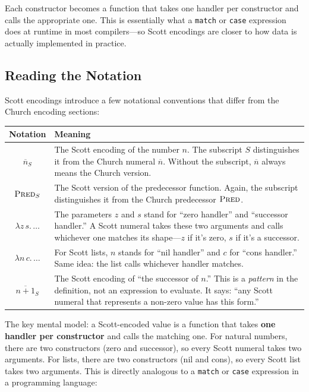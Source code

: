 \documentclass[11pt,a4paper]{article}
\theoremstyle{definition}
\newcommand{\lam}{\lambda}
\newcommand{\church}[1]{\overline{#1}}
\begin{document}
Each constructor becomes a
function that takes one handler per constructor and calls the appropriate one.
This is essentially what a \texttt{match} or \texttt{case} expression does
at runtime in most compilers---so Scott encodings are closer to how data is
actually implemented in practice.

\subsection{Reading the Notation}

Scott encodings introduce a few notational conventions that differ from the
Church encoding sections:

\begin{center}
\renewcommand{\arraystretch}{1.6}
\begin{tabular}{cp{10cm}}
\textbf{Notation} & \textbf{Meaning} \\
\hline
$\church{n}_S$ &
  The Scott encoding of the number $n$. The subscript $S$ distinguishes it from
  the Church numeral $\church{n}$. Without the subscript, $\church{n}$ always
  means the Church version. \\

$\textsc{Pred}_S$ &
  The Scott version of the predecessor function. Again, the subscript
  distinguishes it from the Church predecessor $\textsc{Pred}$. \\

$\lam z\, s.\, \ldots$ &
  The parameters $z$ and $s$ stand for ``zero handler'' and ``successor
  handler.'' A Scott numeral takes these two arguments and calls whichever one
  matches its shape---$z$ if it's zero, $s$ if it's a successor. \\

$\lam n\, c.\, \ldots$ &
  For Scott lists, $n$ stands for ``nil handler'' and $c$ for ``cons handler.''
  Same idea: the list calls whichever handler matches. \\

$\church{n+1}_S$ &
  The Scott encoding of ``the successor of $n$.'' This is a \emph{pattern} in
  the definition, not an expression to evaluate. It says: ``any Scott numeral
  that represents a non-zero value has this form.'' \\
\end{tabular}
\end{center}

The key mental model: a Scott-encoded value is a function that takes
\textbf{one handler per constructor} and calls the matching one.
For natural numbers, there are two constructors (zero and successor),
so every Scott numeral takes two arguments. For lists, there are two
constructors (nil and cons), so every Scott list takes two arguments. This is
directly analogous to a \texttt{match} or \texttt{case} expression in a
programming language:
\end{document}
